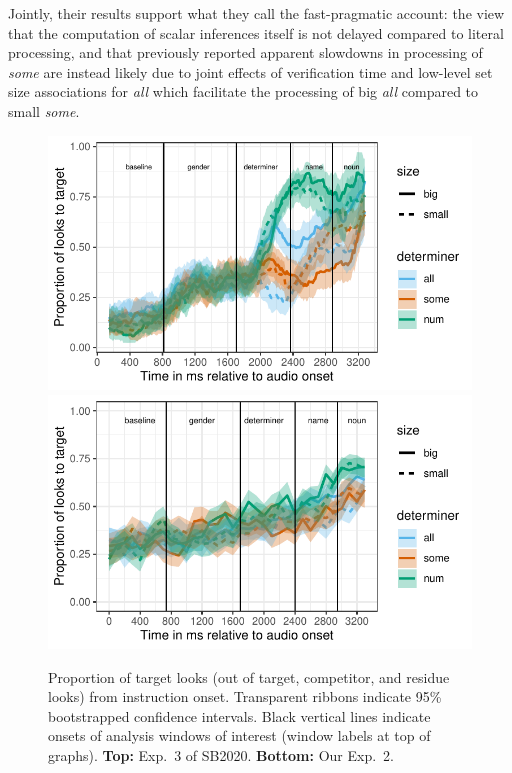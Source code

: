 \documentclass[10pt,letterpaper]{article}
\newcommand{\expref}[1]{Exp.~#1}
\begin{document}
Jointly, their results support what they call the fast-pragmatic account: the view that the computation of scalar inferences itself is not delayed compared to literal processing, and that previously reported apparent slowdowns in processing of \emph{some} are instead likely due to joint effects of verification time and low-level set size associations for \emph{all} which facilitate the processing of big \emph{all} compared to small \emph{some}. 

\begin{figure}[tbh!]
\centering
\includegraphics[width=\columnwidth]{../../analysis/SunBreheny/1_incremental/main/graphs/proportions_condsize_withresidue_target}
\includegraphics[width=\columnwidth]{../../analysis/SunBreheny/2_webgazer/main/graphs/proportions_condsize_withresidue_target}
\caption{Proportion of target looks (out of target, competitor, and residue looks) from instruction onset. Transparent ribbons indicate 95\% bootstrapped confidence intervals. Black vertical lines indicate onsets of analysis windows of interest (window labels at top of graphs). \textbf{Top:} \expref{3} of SB2020. \textbf{Bottom:} Our \expref{2}.}
\label{fig:results-original}
\end{figure}
\end{document}
